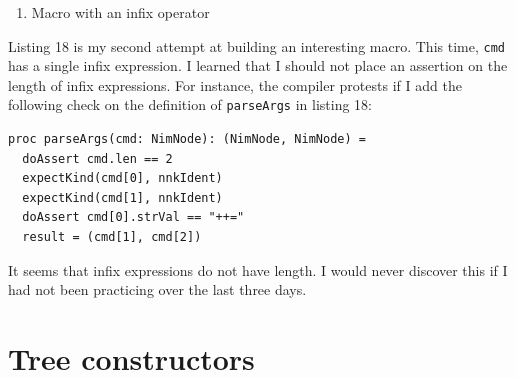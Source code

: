 \documentclass[
  12pt,
]{book}
\providecommand{\tightlist}{%
  \setlength{\itemsep}{0pt}\setlength{\parskip}{0pt}}
\begin{document}
\begin{enumerate}
\def\labelenumi{(\arabic{enumi})}
\setcounter{enumi}{17}
\tightlist
\item
  Macro with an infix operator
\end{enumerate}

Listing 18 is my second attempt at building an interesting macro. This
time, \texttt{cmd} has a single infix expression. I learned that I
should not place an assertion on the length of infix expressions. For
instance, the compiler protests if I add the following check on the
definition of \texttt{parseArgs} in listing 18:

\begin{verbatim}
proc parseArgs(cmd: NimNode): (NimNode, NimNode) =
  doAssert cmd.len == 2
  expectKind(cmd[0], nnkIdent)
  expectKind(cmd[1], nnkIdent)
  doAssert cmd[0].strVal == "++="
  result = (cmd[1], cmd[2]) 
\end{verbatim}

It seems that infix expressions do not have length. I would never
discover this if I had not been practicing over the last three days.

\chapter{Tree constructors}\label{tree-constructors}
\end{document}
